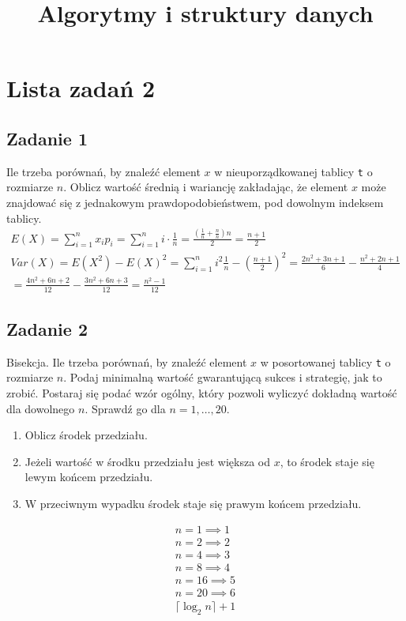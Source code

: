 \documentclass{article}
\begin{document}
\title{Algorytmy i struktury danych}
\author{}
\date{}
\maketitle

\section*{Lista zadań 2}

\subsection*{Zadanie 1}
Ile trzeba porównań, by znaleźć element $x$ w nieuporządkowanej tablicy \verb|t| o rozmiarze
$n$. Oblicz wartość średnią i wariancję zakładając, że element $x$ może znajdować się z
jednakowym prawdopodobieństwem, pod dowolnym indeksem tablicy.
\begin{gather*}
    E(X) = \sum_{i=1}^{n} x_ip_i = \sum_{i=1}^{n} i \cdot \frac{1}{n} = \frac{\left(\frac{1}{n}+\frac{n}{n}\right)n}{2} = \frac{n+1}{2} \\
    Var(X) = E(X^2) - E(X)^2 = \sum_{i=1}^{n} i^2 \frac{1}{n} - \left(\frac{n+1}{2}\right)^2 =    \frac{2n^2+3n+1}{6} - \frac{n^2+2n+1}{4} \\
    = \frac{4n^2+6n+2}{12} - \frac{3n^2+6n+3}{12} = \frac{n^2-1}{12}
\end{gather*}

\subsection*{Zadanie 2}
Bisekcja. Ile trzeba porównań, by znaleźć element $x$ w posortowanej tablicy \verb|t| o rozmiarze
$n$. Podaj minimalną wartość gwarantującą sukces i strategię, jak to zrobić. Postaraj się
podać wzór ogólny, który pozwoli wyliczyć dokładną wartość dla dowolnego $n$. Sprawdź go dla $n = 1, \dots, 20$.
\begin{enumerate}
    \item Oblicz środek przedziału.
    \item Jeżeli wartość w środku przedziału jest większa od $x$, to środek staje się lewym końcem przedziału.
    \item W przeciwnym wypadku środek staje się prawym końcem przedziału.
\end{enumerate}
\begin{gather*}
    n=1 \implies  1 \\
    n=2 \implies  2 \\
    n=4 \implies  3 \\
    n=8 \implies  4 \\
    n=16 \implies 5 \\
    n=20 \implies 6 \\
    \lceil \log_2n \rceil + 1
\end{gather*}
\end{document}
